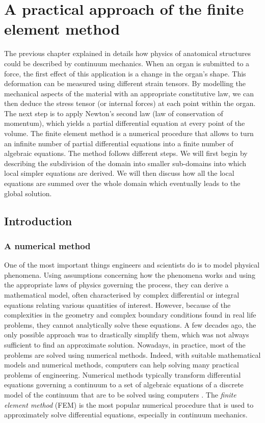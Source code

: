 \chapter{A practical approach of the finite element method}
\label{chap3}
\begin{shortAbstract}
The previous chapter explained in details how physics of anatomical structures could be described by continuum mechanics. When an organ is submitted to a force, the first effect of this application is a change in the organ's shape. This deformation can be measured using different strain tensors. By modelling the mechanical aspects of the material with an appropriate constitutive law, we can then deduce the stress tensor (or internal forces) at each point within the organ. The next step is to apply Newton's second law (law of conservation of momentum), which yields a partial differential equation at every point of the volume. The finite element method is a numerical procedure that allows to turn an infinite number of partial differential equations into a finite number of algebraic equations. The method follows different steps. We will first begin by describing the subdivision of the domain into smaller sub-domains into which local simpler equations are derived. We will then discuss how all the local equations are summed over the whole domain which eventually leads to the global solution. 
\end{shortAbstract}


\section{Introduction}

	\subsection{A numerical method}
One of the most important things engineers and scientists do is to model physical phenomena. Using assumptions concerning how the phenomena works and using the appropriate laws of physics governing the process, they can derive a mathematical model, often characterised by complex differential or integral equations relating various quantities of interest. However, because of the complexities in the geometry and complex boundary conditions found in real life problems, they cannot analytically solve these equations. A few decades ago, the only possible approach was to drastically simplify them, which was not always sufficient to find an approximate solution. Nowadays, in practice, most of the problems are solved using numerical methods. Indeed, with suitable mathematical models and numerical methods, computers can help solving many practical problems of engineering. Numerical methods typically transform differential equations governing a continuum to a set of algebraic equations of a discrete model of the continuum that are to be solved using computers \citep{Reddy93}. The \emph{finite element method} (FEM) is the most popular numerical procedure that is used to approximately solve differential equations, especially in continuum mechanics. 
	
